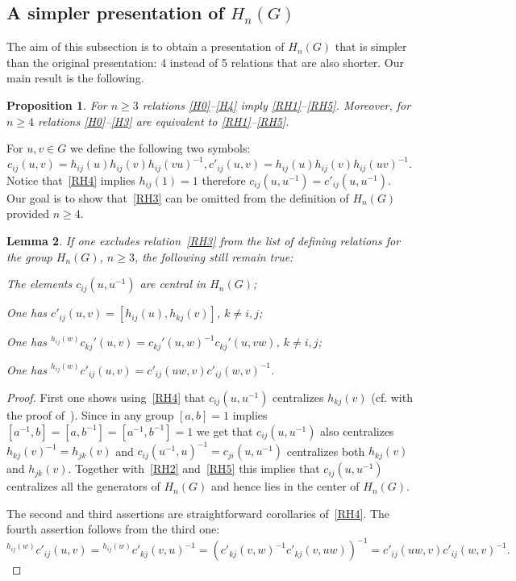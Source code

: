 \documentclass[oneside, 12pt]{amsart}
\theoremstyle{plain}
\numberwithin{equation}{section}
\newtheorem{lemma}{Lemma}
\numberwithin{lemma}{section}
\newtheorem{prop}[lemma]{Proposition}
\theoremstyle{remark}
\theoremstyle{definition}
\begin{document}
\subsection{A simpler presentation of $H_n(G)$}
The aim of this subsection is to obtain a presentation of $H_n(G)$ that is simpler than the original presentation: 4 instead of 5 relations that are also shorter. 
Our main result is the following.
\begin{prop} \label{prop:simpler} 
For $n\geq 3$ relations \eqref{H0}--\eqref{H4} imply \eqref{RH1}--\eqref{RH5}.
Moreover, for $n\geq 4$ relations \eqref{H0}--\eqref{H3} are equivalent to \eqref{RH1}--\eqref{RH5}.
\end{prop}
For $u, v\in G$ we define the following two symbols:
\[c_{ij}(u,v)=h_{ij}(u)h_{ij}(v)h_{ij}(vu)^{-1}, c'_{ij}(u,v)=h_{ij}(u)h_{ij}(v)h_{ij}(uv)^{-1}.\]
Notice that~\eqref{RH4} implies $h_{ij}(1)=1$ therefore $c_{ij}(u, u^{-1}) = c'_{ij}(u, u^{-1})$.
Our goal is to show that~\eqref{RH3} can be omitted from the definition of $H_n(G)$ provided $n \geq 4$.
\begin{lemma} \label{item-lem33} If one excludes relation~\eqref{RH3} from the list of defining relations for the group $H_n(G)$, $n\geq 3$,
 the following still remain true:
 \begin{lemlist}
\item \label{item-lem33-cntr} The elements $c_{ij}(u, u^{-1})$ are central in $H_n(G)$;
\item \label{item-lem33-comm} One has $c'_{ij}(u, v) = [h_{ij}(u), h_{kj}(v)]$, $k\neq i, j$;
\item \label{item-lem33-conj}  One has ${}^{h_{ij}(w)}c_{kj}'(u, v) = c_{kj}'(u, w)^{-1} c_{kj}'(u, vw)$, $k\neq i, j$;
\item \label{item-lem33-conj2} One has ${}^{h_{ij}(w)} c'_{ij}(u, v) = c'_{ij}(uw, v) c'_{ij}(w, v)^{-1}$.
 \end{lemlist}
\end{lemma}
\begin{proof}
First one shows using~\eqref{RH4} that $c_{ij}(u, u^{-1})$ centralizes $h_{kj}(v)$ (cf. with the proof of~\cite[Lemma~2.1(2)]{Reh78}).
Since in any group $[a, b]=1$ implies $[a^{-1}, b] = [a, b^{-1}] = [a^{-1}, b^{-1}] = 1$ we get that $c_{ij}(u, u^{-1})$ also centralizes $h_{kj}(v)^{-1} = h_{jk}(v)$ and
 $c_{ij}(u^{-1}, u)^{-1} = c_{ji}(u, u^{-1})$ centralizes both $h_{kj}(v)$ and $h_{jk}(v)$.
Together with~\eqref{RH2} and~\eqref{RH5} this implies that $c_{ij}(u, u^{-1})$ centralizes all the generators of $H_n(G)$ and hence lies in the center of $H_n(G)$.

The second and third assertions are straightforward corollaries of~\eqref{RH4}.
The fourth assertion follows from the third one:
\[{}^{h_{ij}(w)} c'_{ij}(u, v) = {}^{h_{ij}(w)} c'_{kj}(v, u)^{-1} = (c'_{kj}(v, w)^{-1} c'_{kj}(v, uw))^{-1} = c'_{ij}(uw, v) c'_{ij}(w, v)^{-1}.\]
\end{proof}
\end{document}
